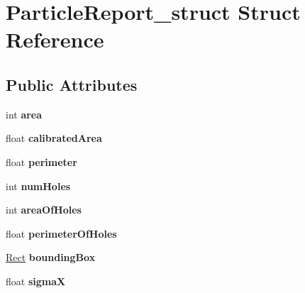\hypertarget{structParticleReport__struct}{
\section{ParticleReport\_\-struct Struct Reference}
\label{structParticleReport__struct}
}
\subsection*{Public Attributes}
\begin{DoxyCompactItemize}
\item 
\hypertarget{structParticleReport__struct_a4343228a236d05ea039c72485fe6395a}{
int {\bfseries area}}
\label{structParticleReport__struct_a4343228a236d05ea039c72485fe6395a}

\item 
\hypertarget{structParticleReport__struct_a798645d0c93f2f8e9c7d5b65ae4c4654}{
float {\bfseries calibratedArea}}
\label{structParticleReport__struct_a798645d0c93f2f8e9c7d5b65ae4c4654}

\item 
\hypertarget{structParticleReport__struct_a490a7e03199b1654fae71bf7d03a6b96}{
float {\bfseries perimeter}}
\label{structParticleReport__struct_a490a7e03199b1654fae71bf7d03a6b96}

\item 
\hypertarget{structParticleReport__struct_a5b4f9161f8452007dd4cb9161d6689f5}{
int {\bfseries numHoles}}
\label{structParticleReport__struct_a5b4f9161f8452007dd4cb9161d6689f5}

\item 
\hypertarget{structParticleReport__struct_ae3386956cd51c64ee0f1293bef845ed9}{
int {\bfseries areaOfHoles}}
\label{structParticleReport__struct_ae3386956cd51c64ee0f1293bef845ed9}

\item 
\hypertarget{structParticleReport__struct_a3acbfc7e362cd77490aed22306b95beb}{
float {\bfseries perimeterOfHoles}}
\label{structParticleReport__struct_a3acbfc7e362cd77490aed22306b95beb}

\item 
\hypertarget{structParticleReport__struct_a0810946e7b3f564eed28a9609d7e541e}{
\hyperlink{structRect__struct}{Rect} {\bfseries boundingBox}}
\label{structParticleReport__struct_a0810946e7b3f564eed28a9609d7e541e}

\item 
\hypertarget{structParticleReport__struct_af4169fd9ba426d6c40f884f078cfe960}{
float {\bfseries sigmaX}}
\label{structParticleReport__struct_af4169fd9ba426d6c40f884f078cfe960}


\end{DoxyCompactItemize}
